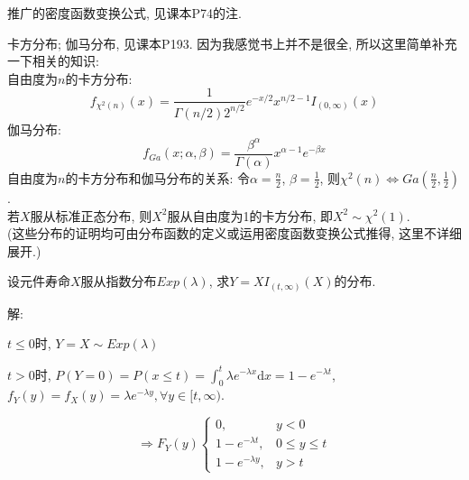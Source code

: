 \documentclass[standard]{ExBook}
\begin{document}
\begin{qitems}
\begin{bbox}
\textcolor{themeColor}{\selectfont {} 推广的密度函数变换公式, 见课本P74的注.}

\textcolor{themeColor}{\selectfont {} 卡方分布; 伽马分布, 见课本P193. 因为我感觉书上并不是很全, 所以这里简单补充一下相关的知识:\\
自由度为$n$的卡方分布:
$$f_{\chi^{2}(n)}(x)=\displaystyle\frac{1}{\Gamma(n/2) 2^{n/2}}e^{-x/2}x^{n/2-1}I_{(0,\infty)}(x)$$
伽马分布:
$$f_{Ga}(x;\alpha,\beta)=\frac{\beta^{\alpha}}{\Gamma(\alpha)}x^{\alpha-1}e^{-\beta x}$$
自由度为$n$的卡方分布和伽马分布的关系: 令$\alpha=\frac{n}{2}$, $\beta=\frac{1}{2}$, 则$\chi^{2}(n)\Longleftrightarrow Ga(\frac{n}{2},\frac{1}{2})$.\\
若$X$服从标准正态分布, 则$X^{2}$服从自由度为1的卡方分布, 即$X^{2}\sim\chi^{2}(1)$.\\
(这些分布的证明均可由分布函数的定义或运用密度函数变换公式推得, 这里不详细展开.)}
    \end{bbox}

\vspace{-5em}

    \begin{bbox}
    \begin{shaded}
        \qitem
设元件寿命$X$服从指数分布$Exp(\lambda)$, 求$Y=XI_{(t,\infty)}(X)$的分布.
    \end{shaded}
    \end{bbox}

\vspace{-5em}

    \begin{bbox}
解: 

$t\leq0$时, $Y=X\sim Exp(\lambda)$

$t>0$时, $P(Y=0)=P(x\leq t)=\displaystyle\int_{0}^{t}\lambda e^{-\lambda x}\mathrm{d}x=1-e^{-\lambda t}$, $f_{Y}(y)=f_{X}(y)=\lambda e^{-\lambda y},\forall y\in[t,\infty)$.
\vspace{-2em}
\begin{center}
\begin{equation}
    \Longrightarrow
    F_{Y}(y)
    \left\{
    \begin{array}{cl}
        \nonumber
        0, &y<0\\
        1-e^{-\lambda t}, &0\leq y\leq t\\
        1-e^{-\lambda y}, &y >t
    \end{array}
    \right.
\end{equation}
\end{center}
    \end{bbox}


\end{qitems}
\end{document}
